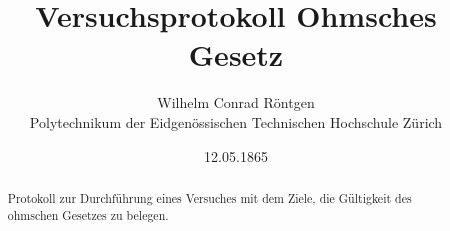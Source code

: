 \documentclass[a4paper,10pt]{report}
\title{Versuchsprotokoll Ohmsches Gesetz}
\author{Wilhelm Conrad Röntgen\\Polytechnikum der Eidgenössischen Technischen Hochschule Zürich}
\date{12.05.1865}
\begin{document}
 \maketitle
 \begin{abstract}
  Protokoll zur Durchführung eines Versuches mit dem Ziele, die Gültigkeit des ohmschen Gesetzes zu belegen. 
 \end{abstract}
 
 
\end{document}
